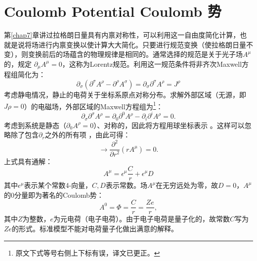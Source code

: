 \section[Coulomb 势]{Coulomb Potential \quad Coulomb 势}
\label{equ11.3}
第\ref{chap7}章讲过拉格朗日量具有内禀对称性，可以利用这一自由度简化计算，也就是说将场进行内禀变换以使计算大大简化。只要进行规范变换（使拉格朗日量不变），则变换前后的场蕴含的物理规律是相同的。通常选择的规范是关于光子场$A^\mu$的，规定%
%
$\partial_\mu A^\mu = 0$，这称为Lorentz规范。利用这一规范条件将非齐次Maxwell方程组简化为：
\begin{equation}
\label{equ11.21}
    \partial_\sigma (\partial^\sigma A^\rho - \partial^\rho A^\sigma) = \partial_\sigma \partial^\sigma A^\rho = J^\rho
\end{equation}
考虑静电情况，静止的电荷关于坐标系原点对称分布。求解外部区域（无源，即$J\rho = 0$）的电磁场，外部区域的Maxwell方程组为\footnote{原文下式等号右侧上下标有误，译文已更正。}：
\begin{equation}
\label{equ11.22}
    \partial_\sigma \partial^\sigma A^\rho = \partial_0 \partial^0 A^\rho - \partial_i \partial^i A^\rho = 0.
\end{equation}
考虑到系统是静态（$\partial_0 A^\rho = 0$）、对称的，因此将方程用球坐标表示%
%
。这样可以忽略除了包含$\partial_r$之外的所有项%
%
，由此可得：
\begin{equation}
\label{equ11.23}
    \to \frac{\partial^2}{\partial r^2} (r A^\mu) = 0.
\end{equation}
上式具有通解：
\begin{equation}
\label{equ11.24}
    A^\mu = \epsilon^\mu \frac{C}{r} + \epsilon^\mu D
\end{equation}
其中$\epsilon^\mu$表示某个常数4-向量，$C, D$表示常数。场$A^\mu$在无穷远处为零，故$D = 0$，$A^\mu$的$0$分量即为著名的Coulomb势：
\begin{equation}
\label{equ11.25}
    A^0 = \Phi = \frac{C}{r} = \frac{Ze}{r},
\end{equation}
其中$Z$为整数，$e$为元电荷（电子电荷）。由于电子电荷是量子化的，故常数$C$写为$Ze$的形式。标准模型不能对电荷量子化做出满意的解释。

